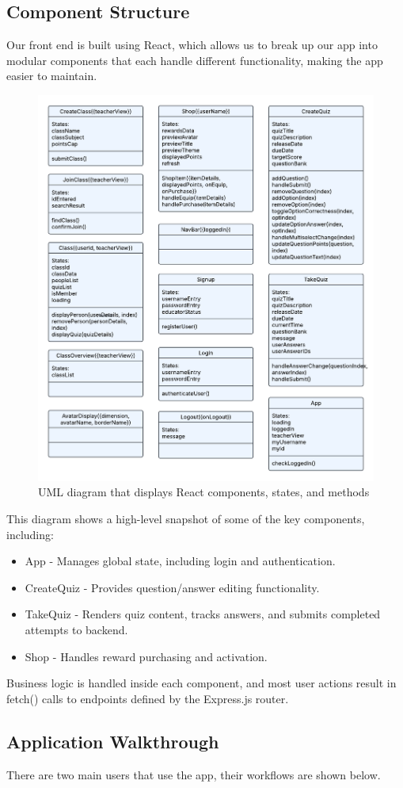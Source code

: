\subsection{Component Structure}
Our front end is built using React, which allows us to break up our app into modular components that each handle different functionality, making the app easier to maintain.
\begin{figure}[H]
    \centering
    \includegraphics[width=0.7\linewidth]{PUT INDIVIDUAL SECTIONS HERE/images/UML_class.png}
    \caption{UML diagram that displays React components, states, and methods}
    \label{fig:enter-label}
\end{figure}
This diagram shows a high-level snapshot of some of the key components, including:
\begin{itemize}
    \item App - Manages global state, including login and authentication.
    \item CreateQuiz - Provides question/answer editing functionality.
    \item TakeQuiz - Renders quiz content, tracks answers, and submits completed attempts to backend.
    \item Shop - Handles reward purchasing and activation.
\end{itemize}
Business logic is handled inside each component, and most user actions result in fetch() calls to endpoints defined by the Express.js router.

\subsection{Application Walkthrough}
There are two main users that use the app, their workflows are shown below.
